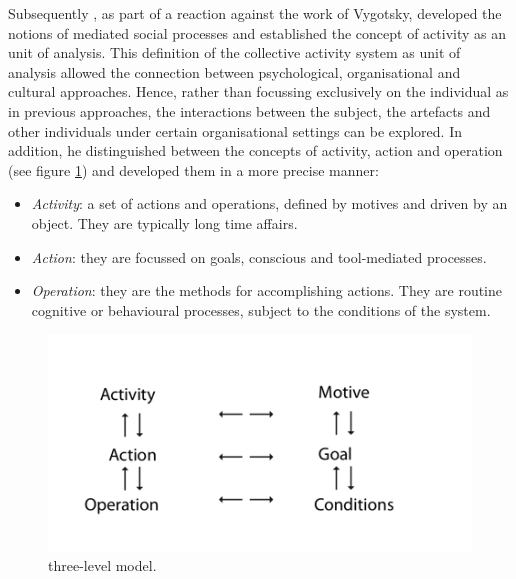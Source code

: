 Subsequently \textcite{leontjev1978activity}, as part of a reaction against the work of Vygotsky, developed the notions of mediated social processes and established the concept of activity as an unit of analysis. This definition of the collective activity system as unit of analysis allowed the connection between psychological, organisational and cultural approaches. Hence, rather than focussing exclusively on the individual as in previous approaches, the interactions between the subject, the artefacts and other individuals under certain organisational settings can be explored. In addition, he distinguished between the concepts of activity, action and operation (see figure \ref{leontiev-three-level-model}) and developed them in a more precise manner:

\begin{itemize}
	\item \textit{Activity}: a set of actions and operations, defined by motives and driven by an object. They are typically long time affairs.
	\item \textit{Action}: they are focussed on goals, conscious and tool-mediated processes.
	\item \textit{Operation}: they are the methods for accomplishing actions. They are routine cognitive or behavioural processes, subject to the conditions of the system.
\end{itemize}

\begin{figure}[H]
	\centering
	\includegraphics[scale=1.2]{img/leontiev_three_level_model.png}
	\caption[Leont'ev's three-level model]%
	{\textcite{leontyev1981outline} three-level model.}
	\label{leontiev-three-level-model}
\end{figure}

